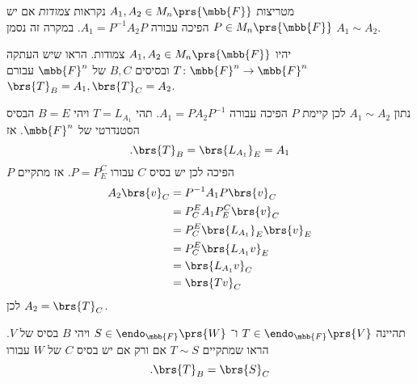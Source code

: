 \documentclass[a4paper,10pt,oneside,openany]{article}
\begin{document}
\begin{exercise}
מטריצות
$A_1, A_2 \in M_n\prs{\mbb{F}}$
נקראות
\emph{צמודות}
אם יש
$P \in M_n\prs{\mbb{F}}$
הפיכה עבורה
$A_1 = P^{-1} A_2 P$.
במקרה זה נסמן
$A_1 \sim A_2$.

יהיו
$A_1, A_2 \in M_n\prs{\mbb{F}}$
צמודות. הראו שיש העתקה
$T \colon \mbb{F}^n \to \mbb{F}^n$
ובסיסים
$B,C$
של
$\mbb{F}^n$
עבורם
$\brs{T}_B = A_1, \brs{T}_C = A_2$.
\end{exercise}

\begin{solution}
נתון
$A_1 \sim A_2$
לכן קיימת
$P$
הפיכה עבורה
$A_1 = P A_2 P^{-1}$.
תהי
$T = L_{A_1}$
ויהי
$B = E$
הבסיס הסטנדרטי של
$\mbb{F}^n$.
אז
\[\text{.} \brs{T}_B = \brs{L_{A_1}}_E = A_1\]
$P$
הפיכה לכן יש בסיס
$C$
עבורו
$P = P^C_E$.
אז מתקיים
\begin{align*}
A_2 \brs{v}_C &= P^{-1} A_1 P \brs{v}_C
\\&= P^E_C A_1 P^C_E \brs{v}_C
\\&= P^E_C \brs{L_{A_1}}_E \brs{v}_E
\\&= P^E_C \brs{L_{A_1} v}_E
\\&= \brs{L_{A_1} v}_C
\\&= \brs{T v}_C
\end{align*}
לכן
$A_2 = \brs{T}_C$.
\end{solution}

\begin{exercise}
תהיינה
$T \in \endo_{\mbb{F}}\prs{V}$
ו־%
$S \in \endo_{\mbb{F}}\prs{W}$
ויהי
$B$
בסיס של
$V$.
הראו שמתקיים
$T \sim S$
אם ורק אם יש בסיס
$C$
של
$W$
עבורו
\[\text{.} \brs{T}_B = \brs{S}_C\]
\end{exercise}
\end{document}
